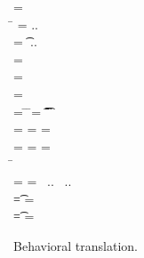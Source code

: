 \documentclass[a4paper,USenglish]{tex/lipics-v2016}
\begin{document}
\begin{figure}[!b]
	
	\hrulefill
	
	\medskip
	
	\small
	\begin{minipage}{12cm}  
		\begin{tabbing}
			 =  \\
			\hspace{4.6cm}\= \WHERE\HS 
			\mdp[1] = \src{\Mdef\m\x\t\tp{\ep[1]}} ..\HS\HS \\
			\>\qquad\HS\HS\HS\HS\md[1] = \Mdef\m\x\t\tp{\e[1]} ..\HS\HS \\
			\>\qquad\HS\HS\HS\HS \ep[1] = \TRG{\e[1]}{\x:\t\,\this:\C}
			\\
			\TRG\x\Env = \src{\x}
			\\
			\TRG{\FRead\f}\Env  = \src{\FRead\f}
			\\
			\TRG{\FWrite\f\e}\Env =  \src{\FWrite\f\ep} 
			\>\WHERE\HS
			\= \TypeCk\K{\this}\C \HS\HS
			\=  \ep = \TAG\e\Env\t \HS\HS
			\= \Ftype\f\t\In\App\K\C
			\\
			\TRG{\Call{\e[1]}\m{\e[2]}}\Env = \src{\DynCall{\ep[1]}\m{\ep[2]}}
			\>\WHERE \> \TypeCk{\K,\Env}{\e[1]}\any \HS
			\> \ep[1] = \TRG{\e[1]}\Env \HS
			\> \ep[2] = \TAG{\e[2]}\Env\any
			\\
			\TRG{\Call{\e[1]}\m{\e[2]}}\Env = \src{\KCall{\ep[1]}\m{\ep[2]}{\D[1]}{\D[2]}}
			\>\WHERE \> \TypeCk{\K,\Env}{\e[1]}\C 
			\> \ep[1] = \TRG{\e[1]}\Env\HS\HS
			\> \ep[2] = \TAG{\e[2]}\Env{\D[1]} \HS\HS \\
			\> \> \=  \Mtype\m{\D[1]}{\D[2]}\In\App\K\C 
			\\
			\Env =  
			\>\WHERE \>  \ep[1] = \TAG{\e[1]}\Env{\t[1]} ~..
			\> \HS\HS\HS\HS\HS\HS\HS\HS\HS\HS \Ftype{\f[1]}{\t[1]}\In\App\K\C ~..
			\\
			\TAG\e\Env\t = \src\ep
			\> \WHERE\> \TypeCk{\K,\Env}\e\tp \HS
			\>\HS\HS\HS\HS\HS\HS\HS\HS\HS\HS \EM{\K\vdash \t \Sub \tp}
			\>\ep = \TRG\e\Env
			\\
			\TAG\e\Env\t = \src{\BehCast\t\e}
			\>\WHERE\> \TypeCk{\K,\Env}\e\tp \HS 
			\>\HS\HS\HS\HS\HS\HS\HS\HS\HS\HS  \EM{\K\vdash \t \not \Sub \tp}
			\> \ep = \TRG\e\Env
		\end{tabbing}
	\end{minipage}
	
	\medskip
	
	\hrulefill
	\caption{Behavioral translation.}\label{trtr2}
\end{figure}
\end{document}
